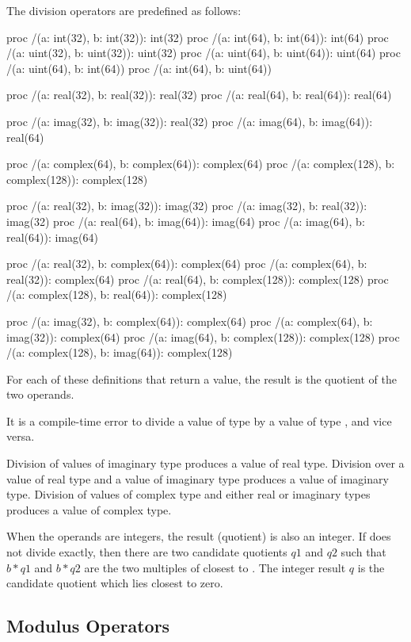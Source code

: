 The division operators are predefined as follows:
\begin{chapel}
proc /(a: int(32), b: int(32)): int(32)
proc /(a: int(64), b: int(64)): int(64)
proc /(a: uint(32), b: uint(32)): uint(32)
proc /(a: uint(64), b: uint(64)): uint(64)
proc /(a: uint(64), b: int(64))
proc /(a: int(64), b: uint(64))

proc /(a: real(32), b: real(32)): real(32)
proc /(a: real(64), b: real(64)): real(64)

proc /(a: imag(32), b: imag(32)): real(32)
proc /(a: imag(64), b: imag(64)): real(64)

proc /(a: complex(64), b: complex(64)): complex(64)
proc /(a: complex(128), b: complex(128)): complex(128)

proc /(a: real(32), b: imag(32)): imag(32)
proc /(a: imag(32), b: real(32)): imag(32)
proc /(a: real(64), b: imag(64)): imag(64)
proc /(a: imag(64), b: real(64)): imag(64)

proc /(a: real(32), b: complex(64)): complex(64)
proc /(a: complex(64), b: real(32)): complex(64)
proc /(a: real(64), b: complex(128)): complex(128)
proc /(a: complex(128), b: real(64)): complex(128)

proc /(a: imag(32), b: complex(64)): complex(64)
proc /(a: complex(64), b: imag(32)): complex(64)
proc /(a: imag(64), b: complex(128)): complex(128)
proc /(a: complex(128), b: imag(64)): complex(128)
\end{chapel}
For each of these definitions that return a value, the result is the
quotient of the two operands.

It is a compile-time error to divide a value of type  by
a value of type , and vice versa.

Division of values of imaginary type produces a value of real type.
Division over a value of real type and a value of imaginary type
produces a value of imaginary type.  Division of values of complex
type and either real or imaginary types produces a value of complex
type.

When the operands are integers, the result (quotient) is also an integer.  If 
does not divide  exactly, then there are two candidate quotients $q1$ and $q2$
such that $b * q1$ and $b * q2$ are the two multiples of  closest to .
The integer result $q$ is the candidate quotient which lies closest to zero.

\subsection{Modulus Operators}
\label{Modulus_Operators}

